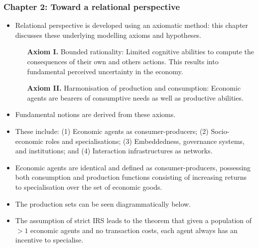 \documentclass[9pt]{beamer}
\begin{document}
\begin{frame} \frametitle{Chapter 2: Toward a relational perspective}
\begin{itemize}
\item Relational perspective is developed using an axiomatic method: this chapter discusses these underlying modelling axioms and hypotheses.
\begin{itemize}
\medskip
\item[\textbf{Axiom I.}] Bounded rationality: Limited cognitive abilities to compute the consequences of their own and others actions. This
results into fundamental perceived uncertainty in the economy.
\medskip
\item[\textbf{Axiom II.}] Harmonisation of production and consumption: Economic agents are bearers of consumptive needs as well as productive abilities.
\end{itemize}
\medskip
\item Fundamental notions are derived from these axioms.
\medskip
\item These include: (1) Economic agents as consumer-producers; (2) Socio-economic roles and specialisations; (3) Embeddedness, governance systems, and institutions; and (4) Interaction infrastructures as networks.
\end{itemize}
\end{frame}


\begin{frame} %
\begin{itemize}
\item Economic agents are identical and defined as consumer-producers, possessing both consumption and production functions consisting of increasing returns to specialisation over the set of economic goods.
\medskip
\item The production sets can be seen diagrammatically below.
\medskip
\item The assumption of strict IRS leads to the theorem that given a population of $> 1$ economic agents and no transaction costs, each agent always has an incentive to specialise.
\end{itemize}
\end{frame}
\end{document}
